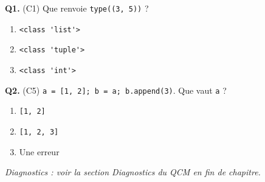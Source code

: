 \documentclass{nexus-manuel}
\begin{document}
\bigskip

\textbf{Q1.} (C1) Que renvoie \lstinline{type((3, 5))} ?
\begin{enumerate}[label=\Alph*.]
  \item \lstinline{<class 'list'>}
  \item \lstinline{<class 'tuple'>}
  \item \lstinline{<class 'int'>}
\end{enumerate}

\textbf{Q2.} (C5) \lstinline{a = [1, 2]; b = a; b.append(3)}.
Que vaut \lstinline{a} ?
\begin{enumerate}[label=\Alph*.]
  \item \lstinline{[1, 2]}
  \item \lstinline{[1, 2, 3]}
  \item Une erreur
\end{enumerate}

\bigskip
\textit{Diagnostics : voir la section Diagnostics du QCM en fin de chapitre.}
\end{document}
